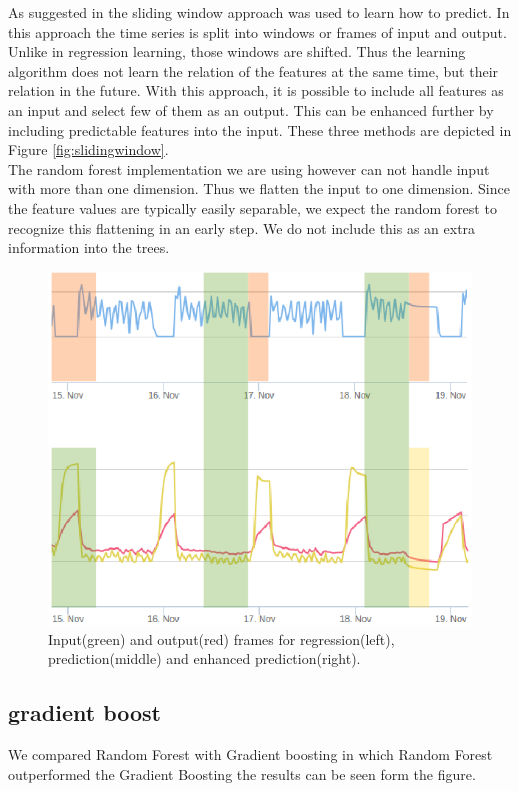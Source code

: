 \documentclass{scrartcl}
\begin{document}
As suggested in \cite{vafaeipour2014application} the sliding window approach was used to learn how to predict. In this approach the time series is split into windows or frames of input and output. Unlike in regression learning, those windows are shifted. Thus the learning algorithm does not learn the relation of the features at the same time, but their relation in the future. With this approach, it is possible to include all features as an input and select few of them as an output. This can be enhanced further by including predictable features into the input. These three methods are depicted in Figure \ref{fig:slidingwindow}.\\
The random forest implementation we are using however can not handle input with more than one dimension. Thus we flatten the input to one dimension. Since the feature values are typically easily separable, we expect the random forest to recognize this flattening in an early step. We do not include this as an extra information into the trees.
\begin{figure}[H]
  \center
  \includegraphics[width=0.6\linewidth]{img/regpred.png}
  \caption{Input(green) and output(red) frames for regression(left), prediction(middle) and enhanced prediction(right).}
  \label{fig:correlation}
\end{figure}
\newpage
\subsection{gradient boost}
We compared Random Forest with Gradient boosting in which Random Forest outperformed the Gradient Boosting the results can be seen form the figure.
\end{document}
